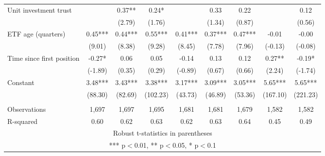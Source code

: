 \documentclass[]{article}
\begin{document}
\begin{tabular}{lcccccccc}
Unit investment trust &  & 0.37** & 0.24* &  & 0.33 & 0.22 &  & 0.12 \\
 &  & (2.79) & (1.76) &  & (1.34) & (0.87) &  & (0.56) \\
ETF age (quarters) & 0.45*** & 0.44*** & 0.55*** & 0.41*** & 0.37*** & 0.47*** & -0.01 & -0.00 \\
 & (9.01) & (8.38) & (9.28) & (8.45) & (7.78) & (7.96) & (-0.13) & (-0.08) \\
Time since first position & -0.27* & 0.06 & 0.05 & -0.14 & 0.13 & 0.12 & 0.27** & -0.19* \\
 & (-1.89) & (0.35) & (0.29) & (-0.89) & (0.67) & (0.66) & (2.24) & (-1.74) \\
Constant & 3.48*** & 3.43*** & 3.38*** & 3.17*** & 3.09*** & 3.05*** & 5.65*** & 5.65*** \\
 & (88.30) & (82.69) & (102.23) & (43.73) & (46.89) & (53.36) & (167.10) & (221.23) \\
 &  &  &  &  &  &  &  &  \\
Observations & 1,697 & 1,697 & 1,695 & 1,681 & 1,681 & 1,679 & 1,582 & 1,582 \\
 R-squared & 0.60 & 0.62 & 0.63 & 0.62 & 0.63 & 0.64 & 0.45 & 0.49 \\ \hline
\multicolumn{9}{c}{ Robust t-statistics in parentheses} \\
\multicolumn{9}{c}{ *** p$<$0.01, ** p$<$0.05, * p$<$0.1} \\
\end{tabular}
\end{document}
